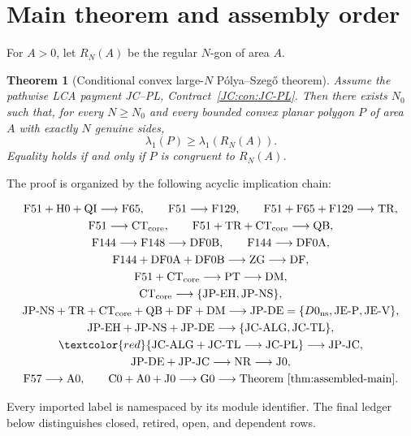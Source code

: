 \documentclass[11pt]{amsart}
\numberwithin{equation}{section}
\newtheorem{theorem}{Theorem}[section]
\theoremstyle{definition}
\theoremstyle{remark}
\begin{document}
\section{Main theorem and assembly order}
\label{sec:assembled-main}

For $A>0$, let $R_N(A)$ be the regular $N$-gon of area $A$.

\begin{theorem}[Conditional convex large-$N$ P\'olya--Szeg\H{o} theorem]
\label{thm:assembled-main}
Assume the pathwise LCA payment JC--PL,
Contract~\ref{JC:con:JC-PL}.  Then there exists $N_0$ such that, for every
$N\ge N_0$ and every bounded convex planar polygon $P$ of area $A$ with
exactly $N$ genuine sides,
\[
 \lambda_1(P)\ge \lambda_1(R_N(A)).
\]
Equality holds if and only if $P$ is congruent to $R_N(A)$.
\end{theorem}

The proof is organized by the following acyclic implication chain:
\begin{scriptsize}
\[
\begin{gathered}
 \mathrm{F51+H0+QI}\longrightarrow\mathrm{F65},\qquad
 \mathrm{F51}\longrightarrow\mathrm{F129},\qquad
 \mathrm{F51+F65+F129}\longrightarrow\mathrm{TR},\\
 \mathrm{F51}\longrightarrow\mathrm{CT_{core}},\qquad
 \mathrm{F51+TR+CT_{core}}\longrightarrow\mathrm{QB},\\
 \mathrm{F144}\longrightarrow\mathrm{F148}\longrightarrow\mathrm{DF0B},
 \qquad \mathrm{F144}\longrightarrow\mathrm{DF0A},\\
 \mathrm{F144+DF0A+DF0B}\longrightarrow\mathrm{ZG}
 \longrightarrow\mathrm{DF},\\
 \mathrm{F51+CT_{core}}\longrightarrow\mathrm{PT}
 \longrightarrow\mathrm{DM},\\
 \mathrm{CT_{core}}\longrightarrow
 \{\mathrm{JP\text{-}EH},\mathrm{JP\text{-}NS}\},\\
 \mathrm{JP\text{-}NS+TR+CT_{core}+QB+DF+DM}
 \longrightarrow\mathrm{JP\text{-}DE}
 =\{D0_{\rm ns},\mathrm{JE\text{-}P},\mathrm{JE\text{-}V}\},\\
 \mathrm{JP\text{-}EH+JP\text{-}NS+JP\text{-}DE}
 \longrightarrow\{\mathrm{JC\text{-}ALG},\mathrm{JC\text{-}TL}\},\\
 \textcolor{red}{\mathrm{JC\text{-}ALG+JC\text{-}TL}
 \longrightarrow\mathrm{JC\text{-}PL}}
 \longrightarrow\mathrm{JP\text{-}JC},\\
 \mathrm{JP\text{-}DE+JP\text{-}JC}\longrightarrow\mathrm{NR}
 \longrightarrow\mathrm{J0},\\
 \mathrm{F57}\longrightarrow\mathrm{A0},\qquad
 \mathrm{C0+A0+J0}\longrightarrow\mathrm{G0}
 \longrightarrow\text{Theorem~\ref{thm:assembled-main}}.
\end{gathered}
\]
\end{scriptsize}
Every imported label is namespaced by its module identifier.  The final
ledger below distinguishes closed, retired, open, and dependent rows.
\end{document}
